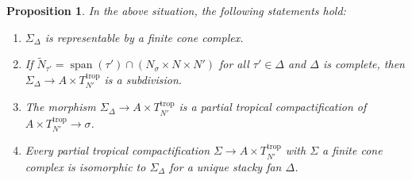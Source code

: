 \documentclass[10pt,a4paper]{amsart}
\newtheorem{proposition}{Proposition}
\DeclareMathOperator{\Span}{span}
\def\trop{\mathrm{trop}}
\begin{document}
\begin{proposition}
	\label{prop:cone_cx_iff_fan}
	In the above situation, the following statements hold:
\begin{enumerate}
	\item $\Sigma_{\Delta}$ is representable by a finite cone complex.
	\item If $\tilde{N}_{\tau'}=\Span(\tau')\cap (N_{\sigma}\times N \times N')$ for all $\tau'\in \Delta$ and $\Delta$ is complete, then $\Sigma_{\Delta}\to A\times T_{N'}^{\trop}$ is a subdivision.
	\item The morphism $\Sigma_{\Delta}\to A\times T_{N'}^{\trop}$ is a partial tropical compactification of $A\times T_{N'}^{\trop}\to \sigma$.
	\item Every partial tropical compactification $\Sigma\to A\times T_{N'}^{\trop}$ with $\Sigma$ a finite cone complex is isomorphic to $\Sigma_{\Delta}$ for a unique stacky fan $\Delta$.
\end{enumerate}
\end{proposition}
\end{document}

